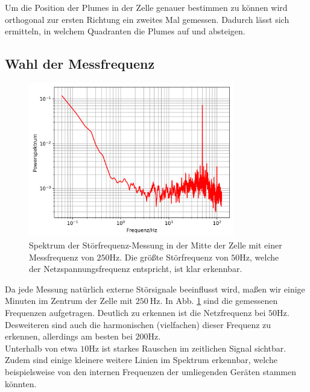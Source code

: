 \documentclass[12pt,a4paper,titlepage,headinclude]{scrartcl}
\numberwithin{equation}{subsection}
\begin{document}
Um die Position der Plumes in der Zelle genauer bestimmen zu können wird orthogonal zur ersten Richtung ein zweites Mal gemessen.
Dadurch lässt sich ermitteln, in welchem Quadranten die Plumes auf und absteigen.
\\



\subsection{Wahl der Messfrequenz}

\begin{figure}[!ht]
\centering
\includegraphics[width=0.8\textwidth]{stoer.png}
\caption{Spektrum der Störfrequenz-Messung in der Mitte der Zelle mit einer Messfrequenz von $250\si{\hertz}$. Die größte Störfrequenz von $50\si{\hertz}$, welche der Netzspannungsfrequenz entspricht, ist klar erkennbar.}
\label{fig:stoer}
\end{figure}

Da jede Messung natürlich externe Störsignale beeinflusst wird, maßen wir einige Minuten im Zentrum der Zelle mit $\SI{250}\hertz$.
In Abb. \ref{fig:stoer} sind die gemessenen Frequenzen aufgetragen.
Deutlich zu erkennen ist die Netzfrequenz bei $50\si{\hertz}$.
Desweiteren sind auch die harmonischen (vielfachen) dieser Frequenz zu erkennen, allerdings am besten bei $200\si{\hertz}$.\\
Unterhalb von etwa $10\si{\hertz}$ ist starkes Rauschen im zeitlichen Signal sichtbar.
Zudem sind einige kleinere weitere Linien im Spektrum erkennbar, welche beispielsweise von den internen Frequenzen der umliegenden Geräten stammen könnten.
\end{document}
